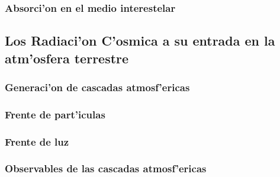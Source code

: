 \subsubsection{Absorci'on en el medio interestelar}

\subsection{Los Radiaci'on C'osmica a su entrada en la
atm'osfera terrestre}

\subsubsection{Generaci'on de cascadas atmosf'ericas}

\subsubsection{Frente de part'iculas}

\subsubsection{Frente de luz \Cherenkov}

\subsubsection{Observables de las cascadas atmosf'ericas}

\endinput
%
